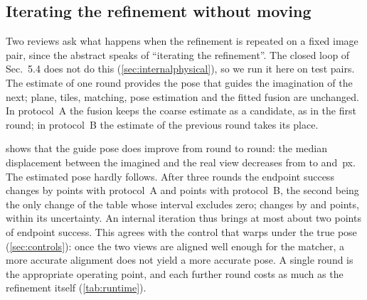 \subsection{Iterating the refinement without moving}
\label{sec:iteration}

Two reviews ask what happens when the refinement is repeated on a fixed image pair, since the abstract speaks of ``iterating the refinement''. The closed loop of Sec.~5.4 does not do this (\cref{sec:internalphysical}), so we run it here on \itN{} test pairs. The estimate of one round provides the pose that guides the imagination of the next; plane, tiles, matching, pose estimation and the fitted fusion are unchanged. In protocol~A the fusion keeps the coarse estimate as a candidate, as in the first round; in protocol~B the estimate of the previous round takes its place.



 shows that the guide pose does improve from round to round: the median displacement between the imagined and the real view decreases from \itOneRes{} to \itTwoARes{} and \itThreeARes\,px. The estimated pose hardly follows. After three rounds the endpoint success changes by \itThreeASRe{} points \ci{\itThreeASReLo}{\itThreeASReHi} with protocol~A and \itThreeBSRe{} points \ci{\itThreeBSReLo}{\itThreeBSReHi} with protocol~B, the second being the only change of the table whose interval excludes zero; \SRd{} changes by \itThreeASRd{} and \itThreeBSRd{} points, within its uncertainty. An internal iteration thus brings at most about two points of endpoint success. This agrees with the control that warps under the true pose (\cref{sec:controls}): once the two views are aligned well enough for the matcher, a more accurate alignment does not yield a more accurate pose. A single round is the appropriate operating point, and each further round costs as much as the refinement itself (\cref{tab:runtime}).
